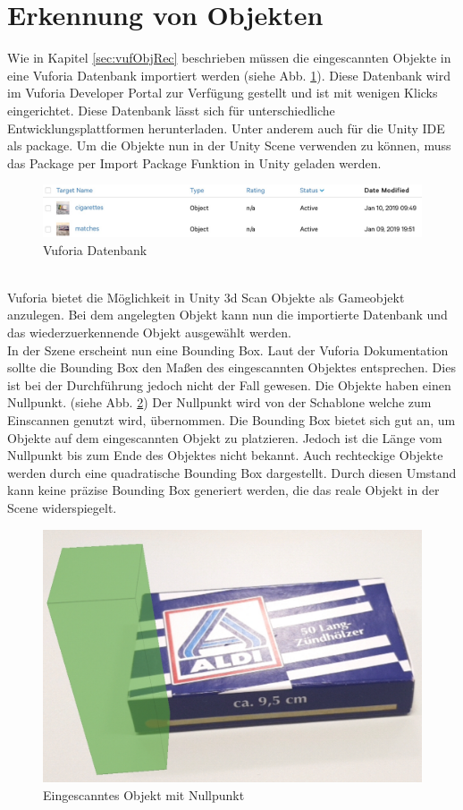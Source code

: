 \section{Erkennung von Objekten}
\label{sec:implementObjRec}
Wie in Kapitel \ref{sec:vufObjRec} beschrieben müssen die eingescannten Objekte in eine Vuforia Datenbank importiert werden (siehe Abb. \ref{fig:vuforiaObjectDatabase}). Diese Datenbank wird im Vuforia Developer Portal zur Verfügung gestellt und ist mit wenigen Klicks eingerichtet. Diese Datenbank lässt sich für unterschiedliche Entwicklungsplattformen herunterladen. Unter anderem auch für die Unity IDE als package. Um die Objekte nun in der Unity Scene verwenden zu können, muss das Package per Import Package Funktion in Unity geladen werden.
\begin{figure}[h]
    \centering
    \includegraphics[width=\textwidth]{assets/vuforiaDataBase.jpeg}
    \caption{Vuforia Datenbank}\label{fig:vuforiaObjectDatabase}
\end{figure}\\
Vuforia bietet die Möglichkeit in Unity 3d Scan Objekte als Gameobjekt anzulegen. Bei dem angelegten Objekt kann nun die importierte Datenbank und das wiederzuerkennende Objekt ausgewählt werden. \\
In der Szene erscheint nun eine Bounding Box. Laut der Vuforia Dokumentation\cite{VufObjRec}  sollte die Bounding Box den Maßen des eingescannten Objektes entsprechen. Dies ist bei der Durchführung jedoch nicht der Fall gewesen. Die Objekte haben einen Nullpunkt. (siehe Abb. \ref{fig:matches}) Der Nullpunkt wird von der Schablone welche zum Einscannen genutzt wird, übernommen. Die Bounding Box bietet sich gut an, um Objekte auf dem eingescannten Objekt zu platzieren. Jedoch ist die Länge vom Nullpunkt bis zum Ende des Objektes nicht bekannt. Auch rechteckige Objekte werden durch eine quadratische Bounding Box dargestellt. Durch diesen Umstand kann keine präzise Bounding Box generiert werden, die das reale Objekt in der Scene widerspiegelt.\\
\begin{figure}[h]
    \centering
    \includegraphics[width=0.5\linewidth]{assets/matches.png}
    \caption{Eingescanntes Objekt mit Nullpunkt}\label{fig:matches}
\end{figure}\\

